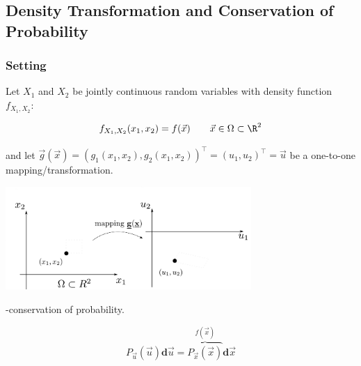 \subsection{Density Transformation and Conservation of Probability}

\begin{frame}
\slidesonly{
\begin{center}
	\huge \subsecname
\end{center}
}
\end{frame}

\subsubsection{Setting}

\begin{frame}%

Let $X_1$ and $X_2$ be jointly continuous random variables with 
density function $f_{X_1, X_2}$:

\svspace{-3mm}

\begin{equation}
f_{X_1, X_2}(x_1, x_2) = f{(\vec x)} \qquad \vec x \in \Omega \subset \R^2
\end{equation}

\pause

and let $\vec g(\vec x) = ( g_1(x_1, x_2), g_2(x_1, x_2))^\top = (u_1, u_2)^\top = \vec u$ be a one-to-one mapping/transformation.

\svspace{-3mm}

\begin{center}
\includegraphics[width=0.7\textwidth]{img/xu_mapping}
\end{center}

\svspace{-3mm}


\pause

-conservation of probability.

\svspace{-8mm}

\begin{equation}
P_{\vec u}({\vec u}) \mathbf{d} {\vec u}
= \overbrace{P_{\vec x}({\vec x})}^{f (\vec {x})} \mathbf{d} {\vec x}
\end{equation}

\end{frame}

